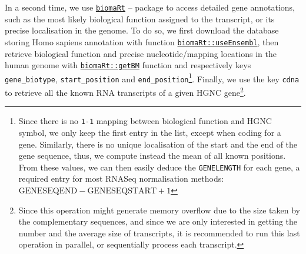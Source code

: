 \begin{Shaded}
\begin{Highlighting}
\OtherTok{\textless{}{-}}\SpecialCharTok{::}
                                      \NormalTok{(}\NormalTok{,}\NormalTok{), }\NormalTok{) }\SpecialCharTok{\%\textgreater{}\%}
\SpecialCharTok{::}\NormalTok{(}\NormalTok{(}\NormalTok{))}

\OtherTok{\textless{}{-}}\SpecialCharTok{\%\textgreater{}\%}
\SpecialCharTok{::}\NormalTok{) }\SpecialCharTok{\%\textgreater{}\%}
\SpecialCharTok{::}\NormalTok{(}
\end{Highlighting}
\end{Shaded}

In a second time, we use \href{NA}{\texttt{biomaRt}} \autocite{biomaRt2005}--\autocite{R-biomaRt} package to access detailed gene annotations, such as the most likely biological function assigned to the transcript, or its precise localisation in the genome. To do so, we first download the database storing Homo sapiens annotation with function \href{https://rdrr.io/pkg/biomaRt/man/useEnsembl.html}{\texttt{biomaRt::useEnsembl}}, then retrieve biological function and precise nucleotide/mapping locations in the human genome with \href{https://rdrr.io/pkg/biomaRt/man/getBM.html}{\texttt{biomaRt::getBM}} function and respectively keys \texttt{gene\_biotype}, \texttt{start\_position} and \texttt{end\_position}\footnote{Since there is no \texttt{1-1} mapping between biological function and HGNC symbol, we only keep the first entry in the list, except when coding for a gene. Similarly, there is no unique localisation of the start and the end of the gene sequence, thus, we compute instead the mean of all known positions. From these values, we can then easily deduce the \texttt{GENELENGTH} for each gene, a required entry for most RNASeq normalisation methods: \(\text{GENESEQEND} - \text{GENESEQSTART} + 1\)}. Finally, we use the key \texttt{cdna} to retrieve all the known RNA transcripts of a given HGNC gene\footnote{Since this operation might generate memory overflow due to the size taken by the complementary sequences, and since we are only interested in getting the number and the average size of transcripts, it is recommended to run this last operation in parallel, or sequentially process each transcript.}.

